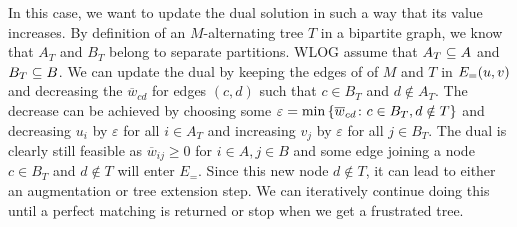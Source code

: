 In this case, we want to update the dual solution in such a way that its value increases. 
By definition of an $M$-alternating tree $T$ in a bipartite graph, we know that $A_T$ and $B_T$ belong to separate partitions. WLOG assume that $A_T \sse A$ and $B_T \sse B$. 
We can update the dual by keeping the edges of of $M$ and $T$ in $\f[E_=]{u, v}$ and decreasing the $\overline{w}_{cd}$ for edges $(c, d)$ such that $c \in B_T$ and $d \notin A_T$. 
The decrease can be achieved by choosing some $\varepsilon = \min \lrc{\overline{w}_{cd} \colon c \in B_T, d \notin T}$
and decreasing $u_i$ by $\varepsilon$ for all $i \in A_T$ and increasing $v_j$ by $\varepsilon$ for all $j \in B_T$. 
The dual is clearly still feasible as $\overline{w}_{ij} \geq 0$ for $i \in A, j \in B$ and some edge
joining a node $c \in B_T$ and $d \notin T$ will enter $E_=$. Since this new node $d \notin T$, it can lead to either an augmentation or 
tree extension step. We can iteratively continue doing this until a perfect matching is returned 
or stop when we get a frustrated tree. 

